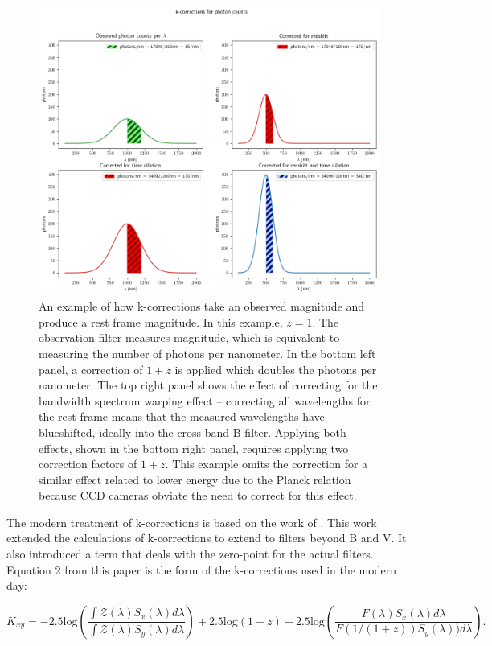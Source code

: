 \documentclass{article}
\begin{document}
\begin{figure}[h]
  \includegraphics[width=\linewidth]{k-corrections_for_photon_counts.png}
  \caption{An example of how k-corrections take an observed magnitude and
  produce a rest frame magnitude. In this example, $z=1$. The observation
  filter measures magnitude, which is equivalent to measuring the number of
  photons per nanometer. In the bottom left panel, a correction of $1+z$ is
  applied which doubles the photons per nanometer. The top right panel shows
  the effect of correcting for the bandwidth spectrum warping effect --
  correcting all wavelengths for the rest frame means that the measured
  wavelengths have blueshifted, ideally into the cross band B filter. Applying
  both effects, shown in the bottom right panel, requires applying two
  correction factors of $1+z$. This example omits the correction for a similar
  effect related to lower energy due to the Planck relation because CCD cameras
  obviate the need to correct for this effect.
  }
  \label{fig:k-example}
\end{figure}

The modern treatment of k-corrections is based on the work of \citet{kim1996}.
This work extended the calculations of k-corrections to extend to filters
beyond B and V. It also introduced a term that deals with the zero-point for the
actual filters. Equation 2 from this paper is the form of the k-corrections
used in the modern day:

\begin{equation}
  K_{xy} = -2.5\text{log} \left(\frac{\int \mathcal{Z}(\lambda)S_x(\lambda)d\lambda}{\int \mathcal{Z}(\lambda)S_y(\lambda)d\lambda}\right) + 2.5\text{log}(1+z) + 2.5\text{log}\left(\frac{F(\lambda)S_x(\lambda)d\lambda}{F(1/(1+z))S_y(\lambda))d\lambda}\right).
\end{equation}
\end{document}
